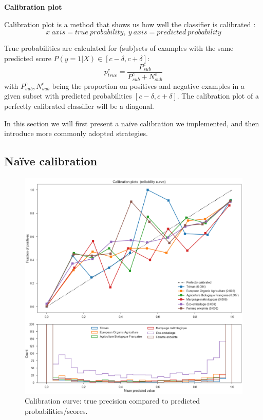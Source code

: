 \textbf{Calibration plot}

Calibration plot is a method that shows us how well the classifier is calibrated \cite{Calibration}: $$x\ axis = true\ probability,\ y\ axis=predicted\ probability$$

True probabilities are calculated for (sub)sets of examples with the same predicted score $P(y=1|X) \in [c-\delta, c+\delta]$: $$ p_{true}^c = \frac{P_{sub}^c}{P_{sub}^c + N_{sub}^c}$$ with $P_{sub}^c, N_{sub}^c$ being the proportion on positives and negative examples in a given subset with predicted probabilities $[c-\delta, c+\delta]$. The calibration plot of a perfectly calibrated classifier will be a diagonal.



In this section we will first present a naïve calibration we implemented, and then introduce more commonly adopted strategies.

\subsection{Naïve calibration}

\begin{figure}[H]
\centering
\includegraphics[scale=0.40]{./images/calibration/islabeledby_calibration_curve.png}
\caption{Calibration curve: true precision compared to predicted probabilities/scores.}
\end{figure}

